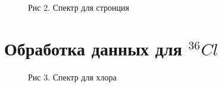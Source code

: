 \documentclass[12pt]{article}
\begin{document}
    \begin{figure}[h!]
      \begin{minipage}[h]{0.99\linewidth}
        Рис 2. Спектр для стронция
      \end{minipage}
      \label{chart:strontium}
    \end{figure}

  \newpage
  \section{Обработка данных для $^{36}Cl$}

    \begin{figure}[h!]
      \begin{minipage}[h]{0.99\linewidth}
        Рис 3. Спектр для хлора
      \end{minipage}
      \label{chart:chlorine}
    \end{figure}
\end{document}
